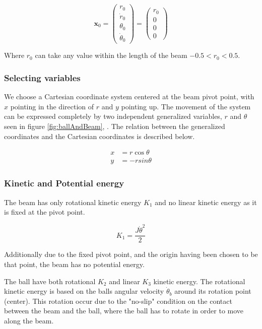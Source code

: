 \documentclass[a4paper, titlepage]{article}
\begin{document}
\begin{equation}
\textbf{x}_0 = 
\begin{pmatrix}
r_0 \\ \dot{r}_0 \\ \theta_0 \\ \dot{\theta}_0
\end{pmatrix} = 
\begin{pmatrix}
r_0 \\ 0 \\ 0 \\ 0
\end{pmatrix}
\label{equ:stateEqulibrium}
\end{equation}

Where $r_0$ can take any value within the length of the beam $-0.5 < r_0 < 0.5$.

\subsubsection{Selecting variables}
We choose a Cartesian coordinate system centered at the beam pivot point, with $x$ pointing in the direction of $r$ and $y$ pointing up.
The movement of the system can be expressed completely by two independent generalized variables, $r$ and $\theta$ seen in figure \ref{fig:ballAndBeam}, .
The relation between the generalized coordinates and the Cartesian coordinates is described below.

\begin{equation}
\begin{split}
x &= r\cos{\theta} \\
y &= -rsin{\theta}
\end{split}
\end{equation}

\subsubsection{Kinetic and Potential energy}
The beam has only rotational kinetic energy $K_1$ and no linear kinetic energy as it is fixed at the pivot point.

\begin{equation}
K_1 = \frac{J\dot{\theta}^2}{2}
\end{equation}

Additionally due to the fixed pivot point, and the origin having been chosen to be that point, the beam has no potential energy.

The ball have both rotational $K_2$ and linear $K_3$ kinetic energy.
The rotational kinetic energy is based on the balls angular velocity $\dot{\theta}_b$ around its rotation point (center).
This rotation occur due to the "no-slip" condition on the contact between the beam and the ball, where the ball has to rotate in order to  move along the beam.
\end{document}
